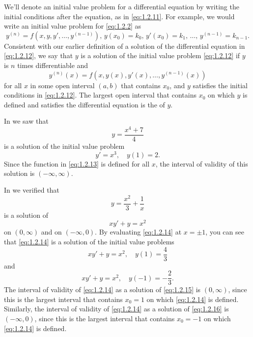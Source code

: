 We'll denote an initial value problem for a differential equation by
writing the initial conditions after the equation, as in
\eqref{eq:1.2.11}. For example, we would write an initial value problem
for \eqref{eq:1.2.2} as
\begin{equation} \label{eq:1.2.12}
y^{(n)}=f(x,y,y', \dots,y^{(n-1)}),\, y(x_0)=k_0,\,
y'(x_0)=k_1,\, \dots,\, y^{(n-1)}=k_{n-1}.
\end{equation}
Consistent with our earlier definition of a solution of the
differential equation in \eqref{eq:1.2.12}, we say that $y$ is a solution
of the initial value problem \eqref{eq:1.2.12}  if $y$ is $n$ times
differentiable and
\[
y^{(n)}(x)=f(x,y(x),y'(x), \dots,y^{(n-1)}(x))
\]
for all $x$ in some open interval $(a,b)$  that contains $x_0$,
and  $y$ satisfies the initial conditions in \eqref{eq:1.2.12}. The
largest open interval that contains $x_0$ on which $y$ is defined and
satisfies the differential equation is  the  of $y$.

\begin{example}\label{example:1.2.6}
In  we saw that
\begin{equation} \label{eq:1.2.13}
y=\frac{x^4+7}{4}
\end{equation}
is a solution of the initial value problem
\[
y'=x^3,\quad y(1)=2.
\]
Since the function in \eqref{eq:1.2.13} is defined for all $x$, the
interval of validity of this solution is $(-\infty,\infty)$.
\end{example}

\begin{example}\label{example:1.2.7}
In  we verified that
\begin{equation} \label{eq:1.2.14}
y=\frac{x^2}{3}+\frac{1}{x}
\end{equation}
is a solution of
\[
xy'+y=x^2
\]
on $(0,\infty)$ and on $(-\infty,0)$. By evaluating \eqref{eq:1.2.14} at
$x=\pm1$, you can see that \eqref{eq:1.2.14} is a solution of the initial
value problems
\begin{equation} \label{eq:1.2.15}
xy'+y=x^2,\quad y(1)=\frac{4}{3}
\end{equation}
and
\begin{equation} \label{eq:1.2.16}
xy'+y=x^2,\quad y(-1)=-\frac{2}{3}.
\end{equation}
The interval of validity of \eqref{eq:1.2.14} as a solution of
\eqref{eq:1.2.15} is $(0,\infty)$, since this is the largest interval
that contains $x_0=1$ on which \eqref{eq:1.2.14} is defined. Similarly, the
interval of validity of \eqref{eq:1.2.14} as a solution of \eqref{eq:1.2.16}
is $(-\infty,0)$, since this is the largest interval that contains
$x_0=-1$ on which \eqref{eq:1.2.14} is defined.
\end{example}

